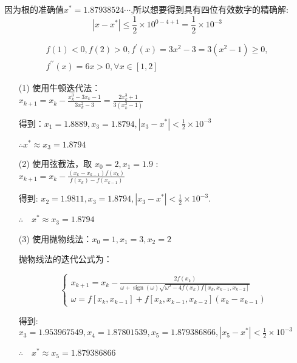 \documentclass[a4paper]{article}
\begin{document}
因为根的准确值$x^{*}=1.87938524 \cdots$,所以想要得到具有四位有效数字的精确解:$$|x - x^{*}| \leq \frac{1}{2} \times 10^{0-4+1} = \frac{1}{2} \times 10^{-3}$$ \par
\begin{equation}
    \begin{array}{l}f(1)<0, f(2)>0, f^{\prime}(x)=3 x^{2}-3=3\left(x^{2}-1\right) \geqslant 0, \\ f^{\prime \prime}(x)=6 x>0, \forall x \in[1,2]\end{array} \nonumber
\end{equation}
\begin{enumerate}
    \item [(1)]
    使用牛顿迭代法：\\
    $x_{k+1}=x_{k}-\frac{x_{k}^{3}-3 x_{k}-1}{3 x_{k}^{2}-3}=\frac{2 x_{k}^{3}+1}{3\left(x_{k}^{2}-1\right)}$\par
    $\text{得到：} x_{1}=1.8889, x_{3}=1.8794,\left|x_{3}-x^{*}\right|<\frac{1}{2} \times 10^{-3}$\par
    $\therefore x^{*} \approx x_{3}=1.8794$
    \item [(2)]
    使用弦截法，取 $x_0=2,x_1=1.9$ :\\
    $x_{k+1}=x_{k}-\frac{\left(x_{k}-x_{k-1}\right) f\left(x_{k}\right)}{f\left(x_{k}\right)-f\left(x_{k-1}\right)}$\par
    得到: $x_{2}=1.9811, x_{3}=1.8794,\left|x_{3}-x^{*}\right|<\frac{1}{2} \times 10^{-3}$. \par
    $\therefore \quad x^{*} \approx x_{3}=1.8794$
    \item [(3)]
    使用抛物线法：$x_0=1,x_1=3,x_2=2$\par
    抛物线法的迭代公式为：\par
    \begin{equation}
        \left\{\begin{array}{l}x_{k+1}=x_{k}-\frac{2 f\left(x_{k}\right)}{\omega+\operatorname{sign}(\omega) \sqrt{\omega^{2}-4 f\left(x_{k}\right) f\left[x_{k}, x_{k-1}, x_{k-2}\right]}} \\ \omega=f\left[x_{k}, x_{k-1}\right]+f\left[x_{k}, x_{k-1}, x_{k-2}\right]\left(x_{k}-x_{k-1}\right)\end{array}\right. \nonumber
    \end{equation}
\par
得到:$x_3=1.953967549,x_4=1.87801539,x_5=1.879386866, \left|x_{5}-x^{*}\right|<\frac{1}{2} \times 10^{-3}$ \par
$\therefore \quad x^{*} \approx x_{5}=1.879386866$
\end{enumerate}
\end{document}
